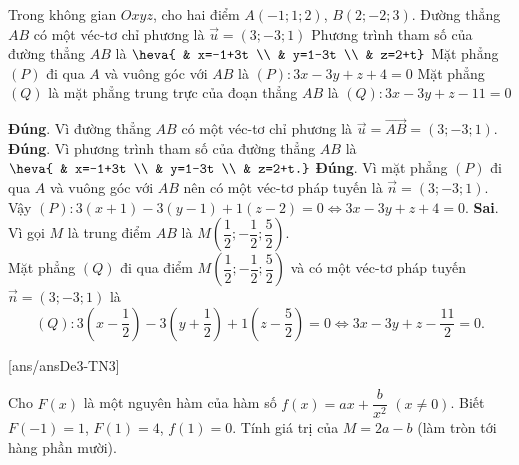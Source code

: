 \begin{ex}%
Trong không gian $Oxyz$, cho hai điểm $A(-1;1;2)$, $B(2;-2;3)$.
\choiceTF
{\True Đường thẳng $AB$ có một véc-tơ chỉ phương là $\overrightarrow{u}=(3;-3;1)$}
{\True Phương trình tham số của đường thẳng $AB$ là $\heva{ & x=-1+3t \\ & y=1-3t \\ & z=2+t}$}
{\True Mặt phẳng $(P)$ đi qua $A$ và vuông góc với $AB$ là $(P)\colon 3x-3y+z+4=0$}
{Mặt phẳng $(Q)$ là mặt phẳng trung trực của đoạn thẳng $AB$ là $(Q) \colon 3x-3y+z-11=0$}
\loigiai
{
\begin{itemchoice}
\itemch \textbf{Đúng}. Vì đường thẳng $AB$ có một véc-tơ chỉ phương là $\overrightarrow{u}=\overrightarrow{AB}=(3;-3;1)$.
\itemch \textbf{Đúng}. Vì phương trình tham số của đường thẳng $AB$ là $\heva{ & x=-1+3t \\ & y=1-3t \\ & z=2+t.}$
\itemch \textbf{Đúng}. Vì mặt phẳng $(P)$ đi qua $A$ và vuông góc với $AB$ nên có một véc-tơ pháp tuyến là $\overrightarrow{n}=(3;-3;1)$. \\
Vậy $(P)\colon 3(x+1)-3(y-1)+1(z-2)=0 \Leftrightarrow 3x-3y+z+4=0$.
\itemch \textbf{Sai}. Vì gọi $M$ là trung điểm $AB$ là $M\left(\dfrac{1}{2};-\dfrac{1}{2};\dfrac{5}{2}\right)$.\\
Mặt phẳng $(Q)$ đi qua điểm $M\left(\dfrac{1}{2};-\dfrac{1}{2};\dfrac{5}{2}\right)$ và có một véc-tơ pháp tuyến $\overrightarrow{n}=(3;-3;1)$ là
\[(Q)\colon 3\left(x-\dfrac{1}{2}\right)-3\left(y+\dfrac{1}{2}\right)+1\left(z-\dfrac{5}{2}\right)=0 \Leftrightarrow 3x-3y+z-\dfrac{11}{2}=0.\]
\end{itemchoice}
}
\end{ex}

\TNSA
{}[ans/ansDe3-TN3]
\begin{ex}%
Cho $F(x)$ là một nguyên hàm của hàm số $f(x) = ax + \dfrac{b}{x^2}$ $(x \neq 0)$. Biết $F(-1) = 1$, $F(1) = 4$, $f(1) = 0$. Tính giá trị của $M = 2a - b$ (làm tròn tới hàng phần mười).
\end{ex}

